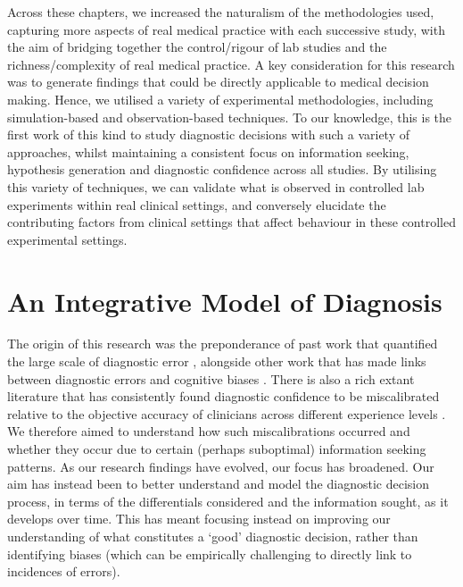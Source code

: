 \documentclass[a4paper, nobind]{templates/ociamthesis}
\begin{document}
Across these chapters, we increased the naturalism of the methodologies used, capturing more aspects of real medical practice with each successive study, with the aim of bridging together the control/rigour of lab studies and the richness/complexity of real medical practice. A key consideration for this research was to generate findings that could be directly applicable to medical decision making. Hence, we utilised a variety of experimental methodologies, including simulation-based and observation-based techniques. To our knowledge, this is the first work of this kind to study diagnostic decisions with such a variety of approaches, whilst maintaining a consistent focus on information seeking, hypothesis generation and diagnostic confidence across all studies. By utilising this variety of techniques, we can validate what is observed in controlled lab experiments within real clinical settings, and conversely elucidate the contributing factors from clinical settings that affect behaviour in these controlled experimental settings.

\section{An Integrative Model of Diagnosis}\label{an-integrative-model-of-diagnosis}

The origin of this research was the preponderance of past work that quantified the large scale of diagnostic error \autocite{kohn_errors_2000,mcglynn_measurement_2015}, alongside other work that has made links between diagnostic errors and cognitive biases \autocite{crowley_automated_2013,restrepo_annals_2020}. There is also a rich extant literature that has consistently found diagnostic confidence to be miscalibrated relative to the objective accuracy of clinicians across different experience levels \autocite{friedman_are_2001,yang_effect_2012,meyer_physicians_2013}. We therefore aimed to understand how such miscalibrations occurred and whether they occur due to certain (perhaps suboptimal) information seeking patterns. As our research findings have evolved, our focus has broadened. Our aim has instead been to better understand and model the diagnostic decision process, in terms of the differentials considered and the information sought, as it develops over time. This has meant focusing instead on improving our understanding of what constitutes a `good' diagnostic decision, rather than identifying biases (which can be empirically challenging to directly link to incidences of errors).\\
\end{document}
